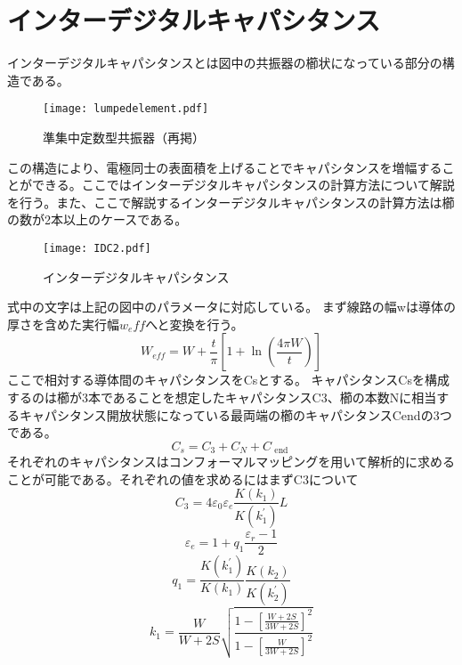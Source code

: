 \section{インターデジタルキャパシタンス}
インターデジタルキャパシタンスとは図中の共振器の櫛状になっている部分の構造である。
\begin{figure}[H]
    \centering
    \texttt{[image: lumpedelement.pdf]}
    \caption{準集中定数型共振器（再掲）}
\end{figure}
この構造により、電極同士の表面積を上げることでキャパシタンスを増幅することができる。ここではインターデジタルキャパシタンスの計算方法について解説を行う。また、ここで解説するインターデジタルキャパシタンスの計算方法は櫛の数が2本以上のケースである。\cite*{Gevorgian1996,Dib2005,Dib2001ComprehensiveSO}
\begin{figure}[H]
    \centering
    \texttt{[image: IDC2.pdf]}
    \caption{インターデジタルキャパシタンス}
\end{figure}
式中の文字は上記の図中のパラメータに対応している。
まず線路の幅wは導体の厚さを含めた実行幅$w_eff$へと変換を行う。\cite*{Gevorgian1996}
\begin{equation}
    W_{e f f}=W+\frac{t}{\pi}\left[1+\ln \left(\frac{4 \pi W}{t}\right)\right]
\end{equation}
ここで相対する導体間のキャパシタンスをCsとする。
キャパシタンスCsを構成するのは櫛が3本であることを想定したキャパシタンスC3、櫛の本数Nに相当するキャパシタンス開放状態になっている最両端の櫛のキャパシタンスCendの3つである。
\begin{equation}
    C_{s}=C_{3}+C_{N}+C_{\text { end }}
\end{equation}
それぞれのキャパシタンスはコンフォーマルマッピングを用いて解析的に求めることが可能である。それぞれの値を求めるにはまずC3について
\begin{equation}
    C_{3}=4 \varepsilon_{0} \varepsilon_{e} \frac{K\left(k_{1}\right)}{K\left(k_{1}^{\prime}\right)} L
\end{equation}\begin{equation}
    \varepsilon_{e}=1+q_{1} \frac{\varepsilon_{r}-1}{2}
\end{equation}
\begin{equation}
        q_{1}=\frac{K\left(k_{1}^{\prime}\right)}{K\left(k_{1}\right)} \frac{K\left(k_{2}\right)}{K\left(k_{2}^{\prime}\right)}
\end{equation}
\begin{equation}
    k_{1}=\frac{W}{W+2 S} \sqrt{\frac{1-\left[\frac{W+2 S}{3 W+2 S}\right]^{2}}{1-\left[\frac{W}{3 W+2 S}\right]^{2}}}
\end{equation}

